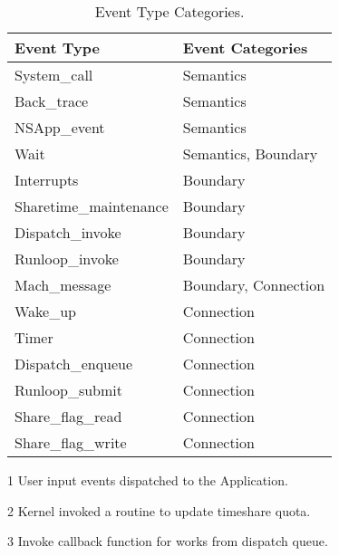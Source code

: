 \begin{table}[ht]
  \centering
  \begin{tabularx}{\columnwidth}{|X|X|}
  	\hline
    \textbf{Event Type} & \textbf{Event Categories}\\
	\hline
	\hline
		System\_call & Semantics\\ \hline
		Back\_trace & Semantics\\ \hline
		NSApp\_event\footnotemark[1] & Semantics \\ \hline
		Wait & Semantics, Boundary \\ \hline
		Interrupts & Boundary \\ \hline
		Sharetime\_maintenance\footnotemark[2] & Boundary \\ \hline
		Dispatch\_invoke\footnotemark[3] & Boundary \\ \hline
		Runloop\_invoke & Boundary \\ \hline
		Mach\_message & Boundary, Connection\\ \hline
		Wake\_up & Connection \\ \hline
		Timer & Connection \\ \hline
		Dispatch\_enqueue & Connection \\ \hline
		Runloop\_submit & Connection \\ \hline
		Share\_flag\_read & Connection \\ \hline
		Share\_flag\_write & Connection \\ \hline
  \end{tabularx}

	\begin{tablenotes}
		\footnotesize
		\item[1] User input events dispatched to the Application.
		\item[2] Kernel invoked a routine to update timeshare quota. 
		\item[3] Invoke callback function for works from dispatch queue.
	\end{tablenotes}
	\caption{Event Type Categories. }
  \label{table:event_types}
\end{table}


